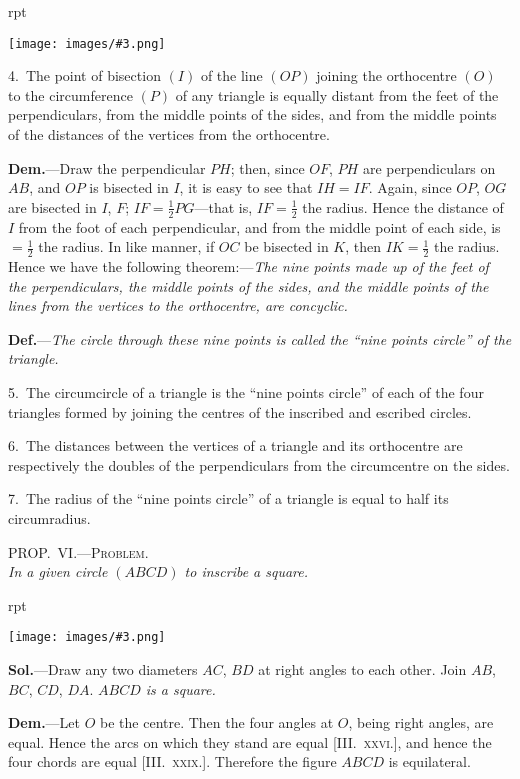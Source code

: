 \documentclass[oneside]{book}
\newcounter{wrapwidth}
\newcommand\myprop[2]{
\bigskip\Needspace*{4\baselineskip}\begin{center}\textsc{#1}\\\medskip\emph{#2}\par\end{center}
}
\newcommand\imgflow[3]{
\setcounter{wrapwidth}{#1}
\begin{wrapfigure}[#2]{r}{\value{wrapwidth}pt}
\begin{center}
\vspace{-0.3in}
\texttt{[image: images/\#3.png]}
\end{center}
\end{wrapfigure}
}
\begin{document}
\begin{footnotesize}
\imgflow{145}{16}{f159}

4.~The point of bisection $(I)$\label{bisection1} of the line $(OP)$ joining the orthocentre
$(O)$ to the circumference $(P)$
of any triangle is equally distant
from the feet of the perpendiculars,
from the middle points of
the sides, and from the middle
points of the distances of the vertices
from the orthocentre.

\textbf{Dem.}---Draw the perpendicular
$PH$; then, since $OF$, $PH$ are
perpendiculars on $AB$, and $OP$ is
bisected in $I$, it is easy to see that
$IH = IF$. Again, since $OP$, $OG$
are bisected in $I$, $F$; $IF = \frac{1}{2}PG$---that
is, $IF = \frac{1}{2}$ the radius. Hence
the distance of $I$ from the foot of each perpendicular, and from
the middle point of each side, is $= \frac{1}{2}$ the radius. In like manner,
if $OC$ be bisected in $K$, then $IK = \frac{1}{2}$ the radius. Hence we have
the following theorem:---\emph{The nine points made up of the feet of the
perpendiculars, the middle points of the sides, and the middle points
of the lines from the vertices to the orthocentre, are concyclic.}

\textbf{Def.}---\emph{The circle through these nine points is called the ``nine
points circle'' of the triangle.}

5.~The circumcircle of a triangle is the ``nine points circle''
of each of the four triangles formed by joining the centres of the
inscribed and escribed circles.

6.~The distances between the vertices of a triangle and its
orthocentre are respectively the doubles of the perpendiculars
from the circumcentre on the sides.

7.~The radius of the ``nine points circle'' of a triangle is equal
to half its circumradius.
\par\end{footnotesize}

\myprop{PROP\@.~VI\@.---Problem.}{In a given circle $(ABCD)$ to inscribe a square.}

\imgflow{120}{10}{f160}

\textbf{Sol.}---Draw any two diameters $AC$, $BD$ at right
angles to each other. Join $AB$,
$BC$, $CD$, $DA$. \emph{$ABCD$ is a square.}

\textbf{Dem.}---Let $O$ be the centre.
Then the four angles at $O$, being
right angles, are equal. Hence
the arcs on which they stand are
equal [\textsc{III\@.~xxvi.}], and hence the
four chords are equal [\textsc{III\@.~xxix.}].
Therefore the figure $ABCD$ is
equilateral.
\end{document}
